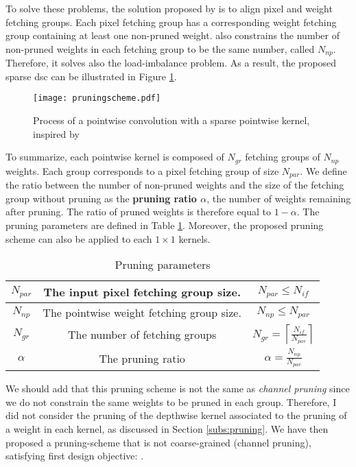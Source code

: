 To solve these problems, the solution proposed by \textcite{kang_accelerator-aware_2020} is to align pixel and weight fetching groups. Each pixel fetching group has a corresponding weight fetching group containing at least one non-pruned weight. \textcite{kang_accelerator-aware_2020} also constrains the number of non-pruned weights in each fetching group to be the same number, called $N_{np}$. Therefore, it solves also the load-imbalance problem. As a result, the proposed sparse \acrshort{dsc} can be illustrated in Figure \ref{fig:prunedwg}.
%
\begin{figure}[H]
    \centering
    \texttt{[image: pruningscheme.pdf]}
    \caption{Process of a pointwise convolution with a sparse pointwise kernel, inspired by \cite{kang_accelerator-aware_2020}}
    \label{fig:prunedwg}
\end{figure}
%
To summarize, each pointwise kernel is composed of $N_{gr}$ fetching groups of $N_{np}$ weights. Each group corresponds to a pixel fetching group of size $N_{par}$. We define the ratio between the number of non-pruned weights and the size of the fetching group without pruning as the \textbf{pruning ratio $\alpha$}, the number of weights remaining after pruning. The ratio of pruned weights is therefore equal to $1 - \alpha$. The pruning parameters are defined in Table \ref{tab:pr_param}. Moreover, the proposed pruning scheme can also be applied to each $1 \times 1$ kernels.
%
\begin{table}[H]
    \center
    \begin{tabular}{|c|c|c|}
        \hline
        $N_{par}$ & The input pixel fetching group size. & $N_{par} \leq N_{if}$ \\
        \hline
        $N_{np}$  & The pointwise weight fetching group size. & $N_{np} \leq N_{par}$ \\
        \hline
        $N_{gr}$  & The number of fetching groups & $N_{gr} = \left\lceil \frac{N_{if}}{N_{par}} \right\rceil $ \\
        \hline
        $\alpha$  & The pruning ratio & $\alpha = \frac{N_{np}}{N_{par}}  $ \\
        \hline
    \end{tabular}
    \caption{Pruning parameters}
    \label{tab:pr_param}
\end{table}
%
We should add that this pruning scheme is not the same as \textit{channel pruning} since we do not constrain the same weights to be pruned in each group. Therefore, I did not consider the pruning of the depthwise kernel associated to the pruning of a weight in each kernel, as discussed in Section \ref{subs:pruning}. We have then proposed a pruning-scheme that is not coarse-grained (channel pruning), satisfying first design objective: \textbf{}.
%
